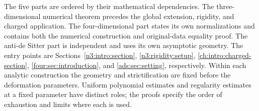The five parts are ordered by their mathematical dependencies.
The three-dimensional numerical theorem precedes the global extension,
rigidity, and charged application. The four-dimensional part states its own normalizations and contains
both the numerical construction and original-data equality proof.
The anti-de Sitter part is independent and uses its own asymptotic
geometry. The entry points are
Sections~\ref{n3:intro:section}, \ref{n3:rigidity:setup},
\ref{ch:intro:charged-section}, \ref{four:sec:introduction}, and
\ref{ads:sec:setting}, respectively.
Within each analytic construction the geometry
and strictification are fixed before the deformation parameters.
Uniform polynomial estimates and regularity estimates at a fixed
parameter have distinct roles; the proofs specify the order of
exhaustion and limits where each is used.
